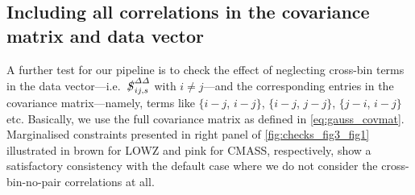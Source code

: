 \documentclass[astrosymb,twocolumn]{aastex631}
\newcommand{\bs}{\ensuremath{b\sigma_8}}
\renewcommand{\fs}{\ensuremath{f\!\sigma_8}}
\newcommand{\stefc}[1]{\textcolor{red}{\textsf{[\textbf{Stef:} #1]}}}
\newcommand{\kost}[1]{\textcolor{orange}{#1}}
\begin{document}



\subsection{Including all correlations in the covariance matrix and data vector}
A further test for our pipeline is to check the effect of neglecting cross-bin terms in the data vector---i.e.\ $\slashed{S}^{\varDelta\varDelta}_{ij,s}$ with $i\ne j$---and the corresponding entries in the covariance matrix---namely, terms like $\{i-j$, $i-j\}$, $\{i-j$, $j-j\}$, $\{j-i$, $i-j\}$ etc. Basically, we use the full covariance matrix as defined in \autoref{eq:gauss_covmat}. Marginalised constraints presented in right panel of \autoref{fig:checks_fig3_fig1} illustrated in brown for LOWZ and pink for CMASS, respectively, show a satisfactory consistency with the default case where we do not consider the cross-bin-no-pair correlations at all.
\end{document}
